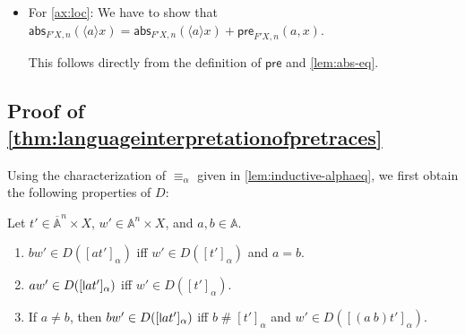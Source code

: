\documentclass[a4paper,UKenglish,cleveref,thm-restate,numberwithinsect,final]{lipics-v2021}
\newcommand{\pre}{\mathsf{pre}}
\newcommand{\abs}{\mathsf{abs}}
\newcommand{\res}{\mathsf{res}}
\newcommand{\Names}{\mathbb{A}}
\newcommand{\barNames}{\overline{\Names}}
\newcommand{\alphaeq}{\equiv_\alpha}
\newcommand{\fresh}{\mathbin{\#}}
\newcommand{\supp}{\mathsf{supp}}
\newcommand{\bind}[1]{\langle #1\rangle}
\theoremstyle{plain}
\newcommand{\midmid}{\hspace{0.2ex}{\rule[-0.1ex]{0.6pt}{1.65ex}}\hspace{0.2ex}}
\newcommand{\newletter}[1]{{\midmid}#1}
\numberwithin{equation}{section}
\newcommand{\+}[1]{\mathcal{#1}\xspace}
\theoremstyle{definition}
\begin{document}
\begin{itemize}
    If \(b \neq e\), pick \(c \in \Names \setminus \supp(x,a,b,e)\).
    We then have
    \begin{align*}
      &\abs_{F'X,n}(\bind{a} \res_{F'X, n}(\bind{b} x))(e) \\
      =~&\res_{F'X,n}(\bind{c} (e\ c) \cdot (a\ c) \cdot \res_{F'X, n}(\bind{b} x)) && \text{definition} \\
      =~&(e\ c) \cdot \res_{F'X,n}(\bind{e} \res_{F'X,n}(\bind{b} (a\ c) \cdot x)) && \text{equivariance} \\
      =~&(e\ c) \cdot \res_{F'X,n}(\bind{b} \res_{F'X,n}(\bind{e} (a\ c) \cdot x)) && \text{axioms} \\
      =~&\res_{F'X,n}(\bind{b} (e\ c) \cdot \res_{F'X,n}(\bind{e} (a\ c) \cdot x)) && \text{equivariance} \\
      =~&\res_{F'X,n}(\bind{b} \abs_{F'X,n}(\bind{a} x)(e)) && \text{definition} \\
      =~&\res_{F'X,n+1}(\bind{b} \abs_{F'X,n}(\bind{a} x))(e) && \text{because } b \neq e.
    \end{align*}
  \item For \eqref{ax:loc}:
    We have to show that \(\abs_{F'X,n}(\bind{a}x) = \abs_{F'X,n}(\bind{a}x) + \pre_{F'X,n}(a,x).\)

    This follows directly from the definition of \(\pre\) and \cref{lem:abs-eq}.
\end{itemize}

\subsection*{Proof of \cref{thm:languageinterpretationofpretraces}}

Using the characterization of \(\alphaeq\) given in \cref{lem:inductive-alphaeq}, we first obtain the following properties of \(D\):

\begin{lemma}\label{lem:generated-language-prefix}
  Let \(t' \in \barNames^{n} \times X\), \(w' \in \Names^n \times X\), and \(a, b \in \Names\).
  \begin{enumerate}
    \item \label{itm:generated-language-prefix-free}
      \(bw' \in D([at']_\alpha)\) iff \(w' \in D([t']_\alpha)\) and \(a = b\).
    \item \label{itm:generated-language-prefix-bound-equal}
      \(aw' \in D([\newletter{a}t']_\alpha)\) iff \(w' \in D([t']_\alpha)\).
    \item \label{itm:generated-language-prefix-bound-different}
      If \(a \neq b\), then \(bw' \in D([\newletter{a}t']_\alpha)\) iff \(b \fresh [t']_\alpha\) and \(w' \in D([(a\ b)t']_\alpha)\).
  \end{enumerate}
\end{lemma}
\end{document}
